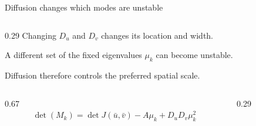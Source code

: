 \begin{frame}{Diffusion changes which modes are unstable}
\begin{columns}[c,onlytextwidth]
    \begin{column}{0.29\textwidth}
        {Changing $D_u$ and $D_v$ changes its location and width.}

      \vspace{0.10cm}

        {A different set of the fixed eigenvalues $\mu_k$ can become unstable.}

      \vspace{0.04cm}

      {\color{HydraMuted}\fontsize{7.5}{9.1}\selectfont
        Diffusion therefore controls the preferred spatial scale.
      \par}
    \end{column}

  \end{columns}

  \vspace{-0.24cm}

  \begin{columns}[c,onlytextwidth]
    \begin{column}{0.67\textwidth}
      \centering
      {\color{HydraWhite}\fontsize{9.4}{12}\selectfont
      \begin{align*}
        \det(M_k)
        =
        \det J(\bar u,\bar v)-A\mu_k+D_uD_v\mu_k^2
      \end{align*}
      }
    \end{column}

    \begin{column}{0.29\textwidth}
    \end{column}
  \end{columns}

\end{frame}


